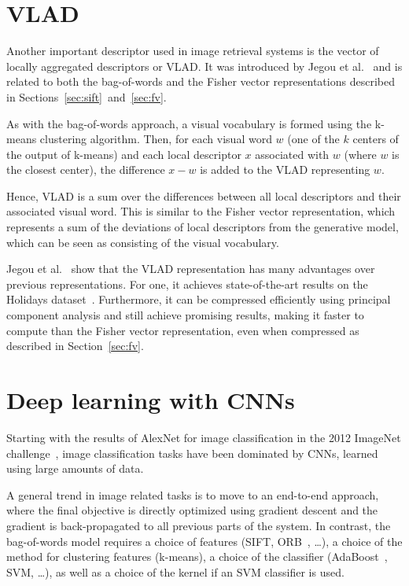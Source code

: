 \section{VLAD}
Another important descriptor used in image retrieval systems is the
vector of locally aggregated descriptors or VLAD. It was introduced
by Jegou et al.~\cite{jegou_aggregating_2010} and is related to both
the bag-of-words and the Fisher vector representations described in
Sections~\ref{sec:sift}~and~\ref{sec:fv}.

As with the bag-of-words approach, a visual vocabulary is formed
using the k-means clustering algorithm. Then, for each visual
word $w$ (one of the $k$ centers of the output of k-means)
and each local descriptor $x$ associated with $w$ (where $w$ is the closest
center), the difference $x-w$ is added to the VLAD representing $w$.

Hence, VLAD is a sum over the differences between all local descriptors
and their associated visual word. This is similar to the Fisher vector
representation, which represents a sum of the deviations of local
descriptors from the generative model, which can be seen as consisting
of the visual vocabulary.

Jegou et al.~\cite{jegou_aggregating_2010} show that the VLAD representation
has many advantages over previous representations. For one, it achieves
state-of-the-art results on the Holidays dataset~\cite{jegou_hamming_2008}.
Furthermore, it can be compressed efficiently using principal component
analysis and still achieve promising results, making it faster to
compute than the Fisher vector representation, even when compressed
as described in Section~\ref{sec:fv}.

\section{Deep learning with CNNs}
Starting with the results of AlexNet for image classification in the 2012
ImageNet challenge~\cite{krizhevsky_imagenet_2012,russakovsky_imagenet_2015},
image classification tasks have been dominated by CNNs, learned using
large amounts of data.

A general trend in image related tasks is to move to an end-to-end
approach, where the final objective is directly optimized using gradient
descent and the gradient is back-propagated to all previous parts of the
system. In contrast, the bag-of-words model requires a choice of
features (SIFT, ORB~\cite{rublee_orb:_2011}, \dots),
a choice of the method for clustering features (k-means),
a choice of the classifier (AdaBoost~\cite{freund_desicion-theoretic_1995},
SVM, \dots), as well as a choice of the kernel if an SVM classifier is used.


